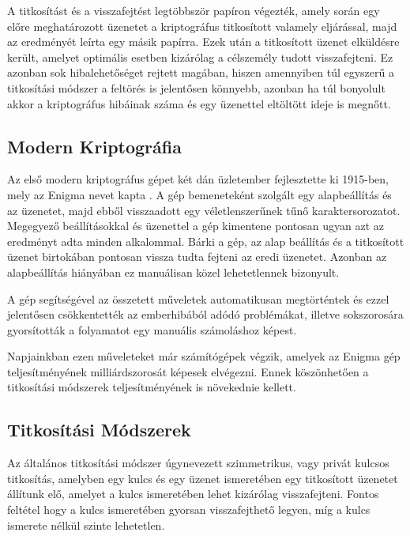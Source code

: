 A titkosítást és a visszafejtést legtöbbször papíron végezték, amely során egy előre meghatározott üzenetet a kriptográfus titkosított valamely eljárással, majd az eredményét leírta egy másik papírra. Ezek után a titkosított üzenet elküldésre került, amelyet optimális esetben kizárólag a célszemély tudott visszafejteni. Ez azonban sok hibalehetőséget rejtett magában, hiszen amennyiben túl egyszerű a titkosítási módszer a feltörés is jelentősen könnyebb, azonban ha túl bonyolult akkor a kriptográfus hibáinak száma és egy üzenettel eltöltött ideje is megnőtt.

\subsection{Modern Kriptográfia}

Az első modern kriptográfus gépet két dán üzletember fejlesztette ki 1915-ben, mely az Enigma nevet kapta \cite{ellis2005exploring}. A gép bemeneteként szolgált egy alapbeállítás és az üzenetet, majd ebből visszaadott egy véletlenszerűnek tűnő karaktersorozatot. Megegyező beállításokkal és üzenettel a gép kimentene pontosan ugyan azt az eredményt adta minden alkalommal. Bárki a gép, az alap beállítás és a titkosított üzenet birtokában pontosan vissza tudta fejteni az eredi üzenetet. Azonban az alapbeállítás hiányában ez manuálisan közel lehetetlennek bizonyult.

A gép segítségével az összetett műveletek automatikusan megtörténtek és ezzel jelentősen csökkentették az emberhibából adódó problémákat, illetve sokszorosára gyorsították a folyamatot egy manuális számoláshoz képest.

Napjainkban ezen műveleteket már számítógépek végzik, amelyek az Enigma gép teljesítményének milliárdszorosát képesek elvégezni. Ennek köszönhetően a titkosítási módszerek teljesítményének is növekednie kellett.

\subsection{Titkosítási Módszerek}

Az általános titkosítási módszer úgynevezett szimmetrikus, vagy privát kulcsos titkosítás, amelyben egy kulcs és egy üzenet ismeretében egy titkosított üzenetet állítunk elő, amelyet a kulcs ismeretében lehet kizárólag visszafejteni. Fontos feltétel hogy a kulcs ismeretében gyorsan visszafejthető legyen, míg a kulcs ismerete nélkül szinte lehetetlen.

